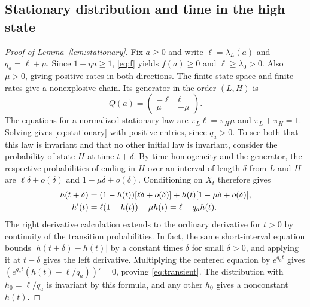 \documentclass[11pt]{article}
\theoremstyle{definition}
\newcommand{\lam}{\lambda_L}
\newcommand{\share}{\pi_H}
\begin{document}
\subsection{Stationary distribution and time in the high state}\label{app:stationary}
\begin{proof}[Proof of Lemma~\ref{lem:stationary}]
Fix $a\geq0$ and write $\ell=\lam(a)$ and $q_a=\ell+\mu$.
Since $1+\eta a\geq1$, \eqref{eq:f} yields $f(a)\geq0$ and
$\ell\geq\lambda_0>0$. Also $\mu>0$, giving positive rates in both
directions. The finite state space and finite rates give a nonexplosive
chain. Its generator in the order $(L,H)$ is
\begin{equation}\label{eq:generator}
 Q(a)=\begin{pmatrix}-\ell & \ell\\ \mu & -\mu\end{pmatrix}.
\end{equation}
The equations for a normalized stationary law are
$\pi_L\ell=\share\mu$ and $\pi_L+\share=1$. Solving gives \eqref{eq:stationary}
with positive entries, since $q_a>0$. To see both that this law is
invariant and that no other initial law is invariant, consider the
probability of state $H$ at time $t+\delta$. By time homogeneity and the
generator, the respective probabilities of ending in $H$ over an interval
of length $\delta$ from $L$ and $H$ are $\ell\delta+o(\delta)$ and
$1-\mu\delta+o(\delta)$. Conditioning on $X_t$ therefore gives
\begin{align}
 h(t+\delta)
 &= (1-h(t))[\ell\delta+o(\delta)]
    +h(t)[1-\mu\delta+o(\delta)],\notag\\
 h'(t)&=\ell(1-h(t))-\mu h(t)=\ell-q_ah(t).
 \label{eq:forward}
\end{align}
The right derivative calculation extends to the ordinary derivative
for $t>0$ by continuity of the transition probabilities. In fact, the
same short-interval equation bounds $|h(t+\delta)-h(t)|$ by a constant
times $\delta$ for small $\delta>0$, and applying it at $t-\delta$ gives
the left derivative. Multiplying the centered equation by $e^{q_at}$
gives $(e^{q_at}(h(t)-\ell/q_a))'=0$, proving \eqref{eq:transient}.
The distribution with $h_0=\ell/q_a$ is invariant by this formula,
and any other $h_0$ gives a nonconstant $h(t)$.


\end{proof}
\end{document}
